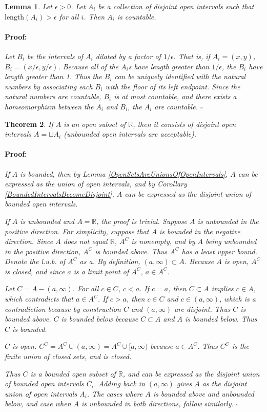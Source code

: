 \documentclass{article}
\newenvironment{proof}{\paragraph{Proof:}}{\hfill$\square$}
\newtheorem{theorem}{Theorem}
\newtheorem{lemma}[theorem]{Lemma}
\begin{document}
\begin{lemma}
\label{IntervalsGreaterThanEpsilonAreCountable}
Let $\epsilon > 0$. Let $A_i$ be a collection of disjoint open intervals such that $\text{length}(A_i) > \epsilon$ for all $i$. Then $A_i$ is countable.
\begin{proof}
Let $B_i$ be the intervals of $A_i$ dilated by a factor of $1/\epsilon$. That is, if $A_i = (x, y)$, $B_i = (x/\epsilon, y/\epsilon)$. Because all of the $A_i$s have length greater than $1/\epsilon$, the $B_i$ have length greater than 1. Thus the $B_i$ can be uniquely identified with the natural numbers by associating each $B_i$ with the floor of its left endpoint. Since the natural numbers are countable, $B_i$ is at most countable, and there exists a homeomorphism between the $A_i$ and $B_i$, the $A_i$ are countable.
\end{proof}
\end{lemma}

\begin{theorem}
\label{OpenSetsAreUnionOfDisjointIntervals}
If $A$ is an open subset of $\mathbb{R}$, then it consists of disjoint open intervals $A = \sqcup A_i$ (unbounded open intervals are acceptable).

\begin{proof}
If $A$ is bounded, then by Lemma \ref{OpenSetsAreUnionsOfOpenIntervals}, $A$ can be expressed as the union of open intervals, and by Corollary \ref{BoundedIntervalsBecomeDisjoint}, $A$ can be expressed as the disjoint union of bounded open intervals.

If $A$ is unbounded and $A = \mathbb{R}$, the proof is trivial. Suppose $A$ is unbounded in the positive direction. For simplicity, suppose that $A$ is bounded in the negative direction. Since $A$ does not equal $\mathbb{R}$, $A^C$ is nonempty, and by $A$ being unbounded in the positive direction, $A^C$ is bounded above. Thus $A^C$ has a least upper bound. Denote the l.u.b. of $A^C$ as a. By definition, $(a, \infty) \subset A$. Because $A$ is open, $A^C$ is closed, and since $a$ is a limit point of $A^C$, $a \in A^C$.

Let $C = A-(a, \infty)$. For all $c \in C$, $c < a$. If $c = a$, then $C \subset A$ implies $c \in A$, which contradicts that $a \in A^C$. If $c > a$, then $c \in C$ and $c \in (a, \infty)$, which is a contradiction because by construction $C$ and $(a, \infty)$ are disjoint. Thus $C$ is bounded above. $C$ is bounded below because $C \subset A$ and $A$ is bounded below. Thus $C$ is bounded.

$C$ is open. $C^C = A^C \cup (a, \infty) = A^C \cup [a, \infty)$ because $a \in A^C$. Thus $C^C$ is the finite union of closed sets, and is closed.

Thus $C$ is a bounded open subset of $\mathbb{R}$, and can be expressed as the disjoint union of bounded open intervals $C_i$. Adding back in $(a, \infty)$ gives $A$ as the disjoint union of open intervals $A_i$. The cases where $A$ is bounded above and unbounded below, and case when $A$ is unbounded in both directions, follow similarly.
\end{proof}
\end{theorem}
\end{document}
